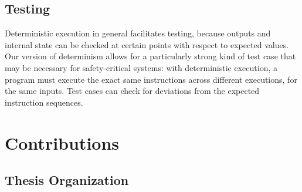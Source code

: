 \subsection{Testing}
Deterministic execution in general facilitates testing,
because outputs and internal state can be checked at 
certain points with respect to expected values. Our version
of determinism allows for a particularly strong kind
of test case that may be necessary for safety-critical 
systems: with deterministic execution, a program 
must execute the exact same instructions 
across different executions, for the same inputs.
Test cases can check for deviations from 
the expected instruction sequences.

\section{Contributions}


\subsection{Thesis Organization}





%

%

